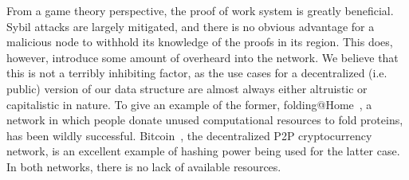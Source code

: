 \documentclass[10pt]{IEEEtran}
\begin{document}
\par From a game theory perspective, the proof of work system is greatly beneficial. Sybil attacks are largely mitigated, and there is no obvious advantage for a malicious node to withhold its knowledge of the proofs in its region. This does, however, introduce some amount of overheard into the network. We believe that this is not a terribly inhibiting factor, as the use cases for a decentralized (i.e. public) version of our data structure are almost always either altruistic or capitalistic in nature. To give an example of the former, folding@Home~, a network in which people donate unused computational resources to fold proteins, has been wildly successful. Bitcoin~, the decentralized P2P cryptocurrency network, is an excellent example of hashing power being used for the latter case. In both networks, there is no lack of available resources.

\printbibliography
\end{document}
